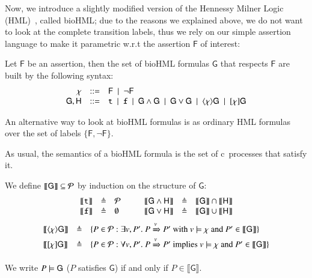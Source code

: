 Now, we introduce a slightly modified version of the Hennessy Milner Logic (HML)~\cite{HM80}, called bioHML; due to the reasons we explained above, we do not want to look at the complete transition labels, thus we rely on our simple assertion language to make it parametric w.r.t the assertion $\mathsf{F}$ of interest:

\begin{definition}[BioHML]
Let   $\mathsf{F}$ be an assertion, then 
the set of bioHML formulas $\mathsf{G}$ that respects $\mathsf{F}$ are built by the following syntax:
$$
\begin{array}{rcl}
\chi & ::= & \mathsf{F}~\mid~ \neg \mathsf{F}\\
\mathsf{G},\mathsf{H} &::= &{\tt t} ~\mid~ {\tt f} ~\mid~ \mathsf{G}\wedge \mathsf{G} ~\mid~ \mathsf{G} \vee \mathsf{G} ~\mid~ \langle \chi \rangle \mathsf{G} ~\mid~ [\chi]\mathsf{G}
\end{array}
$$
\end{definition}

\begin{remark}
An alternative way to look at bioHML formulas is as ordinary HML formulas over the set of labels $\{\mathsf{F},\neg \mathsf{F}\}$.
\end{remark}

As usual, the semantics of a bioHML formula is the set of c\CNA~processes that satisfy it.

\begin{definition}
 We define $\llbracket \mathsf{G}\rrbracket \subseteq {\cal P}$ by induction on the structure of $\mathsf{G}$:
\[
\begin{array}{ccl@{\hspace{1cm}}ccl}
 \llbracket {\tt t}\rrbracket &\defeq& {\cal P} &  \llbracket \mathsf{G}\wedge \mathsf{H}\rrbracket &\defeq&  \llbracket \mathsf{G}\rrbracket  \cap \llbracket \mathsf{H}\rrbracket  \\
\llbracket {\tt f}\rrbracket& \defeq& \emptyset &
  \llbracket \mathsf{G}\vee \mathsf{H}\rrbracket &\defeq&  \llbracket \mathsf{G}\rrbracket  \cup \llbracket \mathsf{H}\rrbracket \\
\end{array}
\]
\[
\begin{array}{lcl}
 \llbracket  \langle \chi \rangle \mathsf{G} \rrbracket &\triangleq& \{P \in {\cal P}: \exists v,P'.\ P\xRightarrow{v}P' \mbox{ with } v \models \chi \mbox{ and } P' \in  \llbracket  \mathsf{G} \rrbracket\} \\
 \llbracket [\chi]\mathsf{G} \rrbracket &\triangleq& \{P \in {\cal P}: \forall v,P'.\ P\xRightarrow{v}P' \mbox{ implies } v \models \chi \mbox{ and } P' \in  \llbracket  \mathsf{G} \rrbracket\}
\end{array}
\]

We write $P \models \mathsf{G}$ ($P$ satisfies $\mathsf{G}$) if and only if $P \in  \llbracket \mathsf{G} \rrbracket$.
\end{definition}

